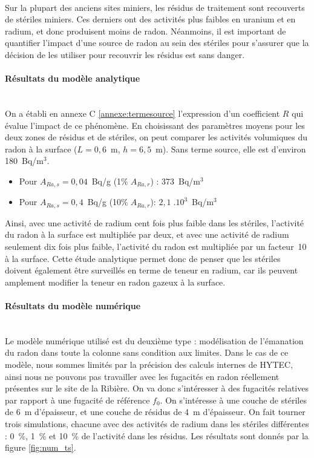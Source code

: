 \documentclass{article}
\begin{document}
\paragraph{} Sur la plupart des anciens sites miniers, les résidus de traitement sont recouverts de stériles miniers. Ces derniers ont des activités plus faibles en uranium et en radium, et donc produisent moins de radon. Néanmoins, il est important de quantifier l'impact d'une source de radon au sein des stériles pour s'assurer que la décision de les utiliser pour recouvrir les résidus est sans danger\cite{ferry_evaluation_2002}.

\paragraph{Résultats du modèle analytique \\ \\}
On a établi en annexe C \ref{annexe:termesource} l'expression d'un coefficient $R$ qui évalue l'impact de ce phénomène. En choisissant des paramètres moyens pour les deux zones de résidus et de stériles, on peut comparer les activités volumiques du radon à la surface ($L=0,6$~m, $h=6,5$~m). Sans terme source, elle est d'environ 180~Bq/m$^3$.
\begin{itemize}
  \item Pour $A_{Ra,s}=0,04$~Bq/g (1$\% \; A_{Ra,r}$) : 373~Bq/m$^3$
  \item Pour $A_{Ra,s}=0,4$~Bq/g (10$\% \; A_{Ra,r}$): $2,1 \; .10^3$~Bq/m$^3$
\end{itemize}
Ainsi, avec une activité de radium cent fois plus faible dans les stériles, l'activité du radon à la surface est multipliée par deux, et avec une activité de radium seulement dix fois plus faible, l'activité du radon est multipliée par un facteur~10 à la surface. Cette étude analytique permet donc de penser que les stériles doivent également être surveillés en terme de teneur en radium, car ils peuvent amplement modifier la teneur en radon gazeux à la surface.

\paragraph{Résultats du modèle numérique \\ \\}
Le modèle numérique utilisé est du deuxième type : modélisation de l'émanation du radon dans toute la colonne sans condition aux limites. Dans le cas de ce modèle, nous sommes limités par la précision des calculs internes de HYTEC, ainsi nous ne pouvons pas travailler avec les fugacités en radon réellement présentes sur le site de la Ribière. On va donc s'intéresser à des fugacités relatives par rapport à une fugacité de référence $f_0$. On s'intéresse à une couche de stériles de 6~m d'épaisseur, et une couche de résidus de 4~m d'épaisseur. On fait tourner trois simulations, chacune avec des activités de radium dans les stériles différentes : 0~\%, 1~\% et 10~\% de l'activité dans les résidus. Les résultats sont donnés par la figure \ref{fig:num_ts}.
\end{document}
